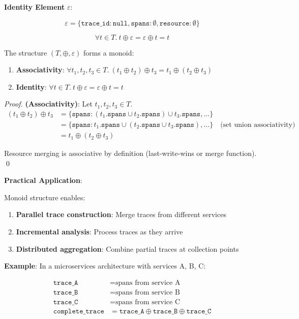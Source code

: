 \textbf{Identity Element} $\varepsilon$:

\[
\varepsilon = \{\texttt{trace\_id}: \texttt{null}, \texttt{spans}: \emptyset, \texttt{resource}: \emptyset\}
\]

\[
\forall t \in T.\ t \oplus \varepsilon = \varepsilon \oplus t = t
\]

\begin{theorem}
\label{thm:monoid}
The structure $(T, \oplus, \varepsilon)$ forms a monoid:
\begin{enumerate}
\item \textbf{Associativity}: $\forall t_1, t_2, t_3 \in T.\ (t_1 \oplus t_2) \oplus t_3 = t_1 \oplus (t_2 \oplus t_3)$
\item \textbf{Identity}: $\forall t \in T.\ t \oplus \varepsilon = \varepsilon \oplus t = t$
\end{enumerate}
\end{theorem}

\begin{proof}
\textbf{(Associativity)}: Let $t_1, t_2, t_3 \in T$.
\begin{align*}
(t_1 \oplus t_2) \oplus t_3 
  &= \{\texttt{spans}: (t_1.\texttt{spans} \cup t_2.\texttt{spans}) \cup t_3.\texttt{spans}, \ldots\} \\
  &= \{\texttt{spans}: t_1.\texttt{spans} \cup (t_2.\texttt{spans} \cup t_3.\texttt{spans}), \ldots\} \quad \text{(set union associativity)} \\
  &= t_1 \oplus (t_2 \oplus t_3)
\end{align*}

Resource merging is associative by definition (last-write-wins or merge function). \qed
\end{proof}

\textbf{Practical Application}:

Monoid structure enables:
\begin{enumerate}
\item \textbf{Parallel trace construction}: Merge traces from different services
\item \textbf{Incremental analysis}: Process traces as they arrive
\item \textbf{Distributed aggregation}: Combine partial traces at collection points
\end{enumerate}

\textbf{Example}: In a microservices architecture with services A, B, C:

\begin{align*}
\texttt{trace\_A} &= \text{spans from service A} \\
\texttt{trace\_B} &= \text{spans from service B} \\
\texttt{trace\_C} &= \text{spans from service C} \\
\texttt{complete\_trace} &= \texttt{trace\_A} \oplus \texttt{trace\_B} \oplus \texttt{trace\_C}
\end{align*}

